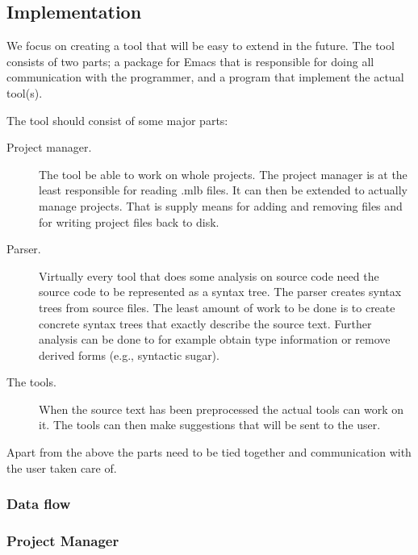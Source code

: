 \documentclass[a4paper,oneside]{memoir}
\begin{document}


\subsection{Implementation}
We focus on creating a tool that will be easy to extend in the
future. The tool consists of two parts; a package for Emacs that is
responsible for doing all communication with the programmer, and a
program that implement the actual tool(s).

The tool should consist of some major parts:
\begin{description}
\item[Project manager.] The tool be able to work on whole
  projects. The project manager is at the least responsible for
  reading .mlb files. It can then be extended to actually manage
  projects. That is supply means for adding and removing files and for
  writing project files back to disk.
\item[Parser.] Virtually every tool that does some analysis on source
  code need the source code to be represented as a syntax tree. The
  parser creates syntax trees from source files. The least amount of
  work to be done is to create concrete syntax trees that exactly
  describe the source text. Further analysis can be done to for
  example obtain type information or remove derived forms (e.g.,
  syntactic sugar).
\item[The tools.] When the source text has been preprocessed the
  actual tools can work on it. The tools can then make suggestions
  that will be sent to the user.
\end{description}

Apart from the above the parts need to be tied together and
communication with the user taken care of.


\subsubsection{Data flow}

\subsubsection{Project Manager}
\end{document}
